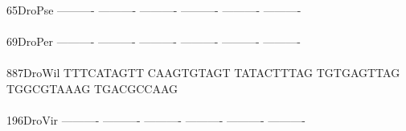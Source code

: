 \documentclass[11pt,twoside,reqno,a4paper]{article}
\begin{document}
{65\hspace*{3\charwidth}DroPse	----------	----------	----------	----------	----------	----------	\\
\hspace*{5\charwidth}\hspace*{7\charwidth}\hspace*{1\charwidth}\hspace*{1\charwidth}\hspace*{1\charwidth}\hspace*{1\charwidth}\hspace*{1\charwidth}\hspace*{1\charwidth}\\
69\hspace*{3\charwidth}DroPer	----------	----------	----------	----------	----------	----------	\\
\hspace*{5\charwidth}\hspace*{7\charwidth}\hspace*{1\charwidth}\hspace*{1\charwidth}\hspace*{1\charwidth}\hspace*{1\charwidth}\hspace*{1\charwidth}\hspace*{1\charwidth}\\
887\hspace*{2\charwidth}DroWil	TTTCATAGTT	CAAGTGTAGT	TATACTTTAG	TGTGAGTTAG	TGGCGTAAAG	TGACGCCAAG	\\
\hspace*{5\charwidth}\hspace*{7\charwidth}\hspace*{1\charwidth}\hspace*{1\charwidth}\hspace*{1\charwidth}\hspace*{1\charwidth}\hspace*{1\charwidth}\hspace*{1\charwidth}\\
196\hspace*{2\charwidth}DroVir	----------	----------	----------	----------	----------	----------	\\
\hspace*{5\charwidth}\hspace*{7\charwidth}\hspace*{1\charwidth}\hspace*{1\charwidth}\hspace*{1\charwidth}\hspace*{1\charwidth}\hspace*{1\charwidth}\hspace*{1\charwidth}\\
}
\end{document}
